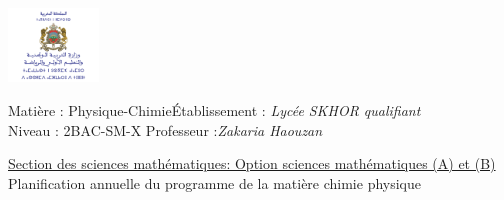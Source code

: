 \documentclass[12pt]{article}
\newcommand\headerMe[2]{\noindent{}#1\hfill#2}
\begin{document}
\begin{center}
\includegraphics[width = 0.18\textwidth]{./img/logoMin.png}
\vspace{-3cm}
\end{center}
\headerMe{Matière : Physique-Chimie}{Établissement : \emph{Lycée SKHOR qualifiant}}\\
\headerMe{ Niveau : 2BAC-SM-X }{  Professeur :\emph{Zakaria Haouzan}}\\

\begin{center}
	\vspace{0.5cm}
\underline{Section des sciences mathématiques: Option sciences mathématiques (A) et (B)}
\\
\hrulefill
\Large{Planification annuelle
du programme de la matière chimie physique}
\hrulefill\\
\end{center}
\end{document}
